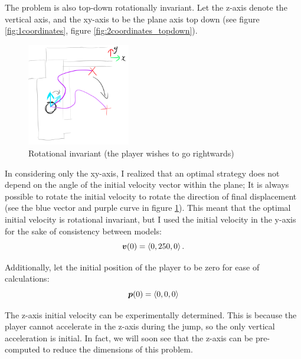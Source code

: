 The problem is also top-down rotationally invariant. Let the z-axis denote the vertical axis, and the xy-axis to be the plane axis top down (see figure \ref{fig:1coordinates}, figure \ref{fig:2coordinates_topdown}).

\begin{figure}[H]
    \centering
    \includegraphics[width=0.4\textwidth]{assets/2turning.png}
    \caption{Rotational invariant (the player wishes to go rightwards)}
    \label{fig:2turning}
\end{figure}

In considering only the xy-axis, I realized that an optimal strategy does not depend on the angle of the initial velocity vector within the plane; It is always possible to rotate the initial velocity to rotate the direction of final displacement (see the blue vector and purple curve in figure \ref{fig:2turning}). This meant that the optimal initial velocity is rotational invariant, but I used the initial velocity in the y-axis for the sake of consistency between models:
\[
    \boldsymbol{v}(0) = \left\langle 0, 250, 0 \right\rangle.
\]

Additionally, let the initial position of the player to be zero for ease of calculations:
\[
    \boldsymbol{p}(0) = \left\langle 0, 0, 0 \right\rangle
\]

The z-axis initial velocity can be experimentally determined. This is because the player cannot accelerate in the z-axis during the jump, so the only vertical acceleration is initial. In fact, we will soon see that the z-axis can be pre-computed to reduce the dimensions of this problem.

